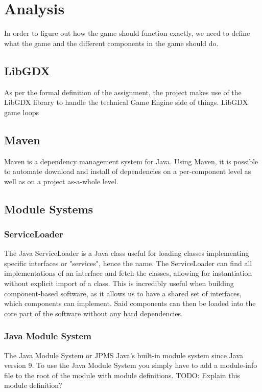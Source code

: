 \section{Analysis}
In order to figure out how the game should function exactly, we need to define what the game and the different components in the game should do.

\subsection{LibGDX}
As per the formal definition of the assignment, the project makes use of the LibGDX library to handle the technical Game Engine side of things.
LibGDX game loops

\subsection{Maven}
Maven is a dependency management system for Java. Using Maven, it is possible to automate download and install of dependencies on a per-component level as well as on a project as-a-whole level.

\subsection{Module Systems}

\subsubsection{ServiceLoader}
The Java ServiceLoader is a Java class useful for loading classes implementing specific interfaces or "services", hence the name. The ServiceLoader can find all implementations of an interface and fetch the classes, allowing for instantiation without explicit import of a class. This is incredibly useful when building component-based software, as it allows us to have a shared set of interfaces, which components can implement. Said components can then be loaded into the core part of the software without any hard dependencies.

\subsubsection{Java Module System}
The Java Module System or JPMS Java's built-in module system since Java version 9. To use the Java Module System you simply have to add a module-info file to the root of the module with module definitions. TODO: Explain this module definition?

